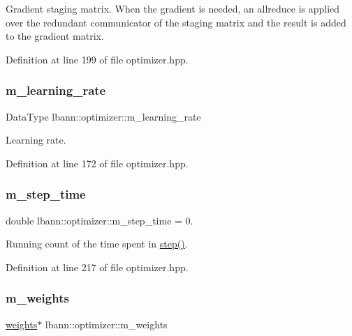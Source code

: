 Gradient staging matrix. When the gradient is needed, an allreduce is applied over the redundant communicator of the staging matrix and the result is added to the gradient matrix. 

Definition at line 199 of file optimizer.\+hpp.

\mbox{\label{classlbann_1_1optimizer_ad393dcdcb82b44510c586ed5ec46d4dd}} 
\subsubsection{\texorpdfstring{m\+\_\+learning\+\_\+rate}{m\_learning\_rate}}
{\footnotesize\ttfamily Data\+Type lbann\+::optimizer\+::m\+\_\+learning\+\_\+rate\hspace{0.3cm}{\ttfamily [protected]}}

Learning rate. 

Definition at line 172 of file optimizer.\+hpp.

\mbox{\label{classlbann_1_1optimizer_afc424c715008fb4d900548f7934ea856}} 
\subsubsection{\texorpdfstring{m\+\_\+step\+\_\+time}{m\_step\_time}}
{\footnotesize\ttfamily double lbann\+::optimizer\+::m\+\_\+step\+\_\+time = 0.\hspace{0.3cm}{\ttfamily [private]}}

Running count of the time spent in \hyperlink{classlbann_1_1optimizer_aa9f43ca3f22edc0a25d0509b6514a411}{step()}. 

Definition at line 217 of file optimizer.\+hpp.

\mbox{\label{classlbann_1_1optimizer_a33b57b578a089d9ffe6715bb3996907c}} 
\subsubsection{\texorpdfstring{m\+\_\+weights}{m\_weights}}
{\footnotesize\ttfamily \hyperlink{classlbann_1_1weights}{weights}$\ast$ lbann\+::optimizer\+::m\+\_\+weights\hspace{0.3cm}{\ttfamily [protected]}}

